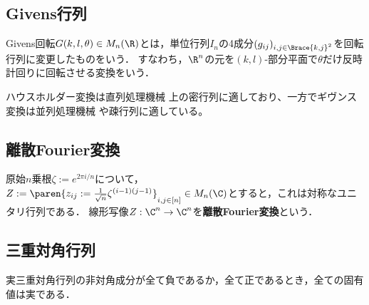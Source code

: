 \documentclass[uplatex, dvipdfmx]{jsreport}
\begin{document}
\subsection{Givens行列}

\begin{definition}
    Givens回転$G(k,l,\theta)\in M_n(\R)$とは，単位行列$I_n$の4成分$(g_{ij})_{i,j\in\Brace{k,j}^2}$を回転行列に変更したものをいう．
    すなわち，$\R^n$の元を$(k,l)$-部分平面で$\theta$だけ反時計回りに回転させる変換をいう．
\end{definition}
\begin{remarks}
    ハウスホルダー変換は直列処理機械
    上の密行列に適しており、一方でギヴンス変換は並列処理機械
    や疎行列に適している。
\end{remarks}

\subsection{離散Fourier変換}

\begin{definition}
    原始$n$乗根$\zeta:=e^{2\pi i/n}$について，$Z:=\paren{z_{ij}:=\frac{1}{\sqrt{n}}\zeta^{(i-1)(j-1)}}_{i,j\in[n]}\in M_n(\C)$とすると，これは対称なユニタリ行列である．
    線形写像$Z:\C^n\to\C^n$を\textbf{離散Fourier変換}という．
\end{definition}

\subsection{三重対角行列}

\begin{theorem}\label{thm-eigenvalue-of-tridiagonal-matrix}
    実三重対角行列の非対角成分が全て負であるか，全て正であるとき，全ての固有値は実である．
\end{theorem}
\end{document}
